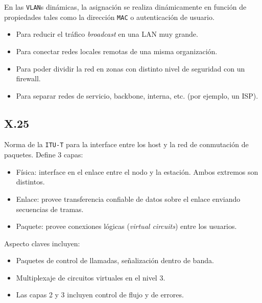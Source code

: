 \documentclass[]{article}
\begin{document}
En las \texttt{VLAN}s dinámicas, la asignación se realiza dinámicamente en función de propiedades tales como la dirección \texttt{MAC} o autenticación de usuario.


\begin{itemize}
    \item Para reducir el tráfico \emph{broadcast} en una LAN muy grande.
    \item Para conectar redes locales remotas de una misma organización.
    \item Para poder dividir la red en zonas con distinto nivel de seguridad con un firewall.
    \item Para separar redes de servicio, backbone, interna, etc. (por ejemplo, un ISP).
\end{itemize}


\subsection{X.25}
Norma de la \texttt{ITU-T} para la interface entre los host y la red de conmutación de paquetes. Define 3 capas:

\begin{itemize}
    \item Física: interface en el enlace entre el nodo y la estación. Ambos extremos son distintos.
    \item Enlace: provee transferencia confiable de datos sobre el enlace enviando secuencias de tramas.
    \item Paquete: provee conexiones lógicas (\emph{virtual circuits}) entre los usuarios.
\end{itemize}

Aspecto claves incluyen:
\begin{itemize}
    \item Paquetes de control de llamadas, señalización dentro de banda.
    \item Multiplexaje de circuitos virtuales en el nivel 3.
    \item Las capas 2 y 3 incluyen control de flujo y de errores.
\end{itemize}


\end{document}
